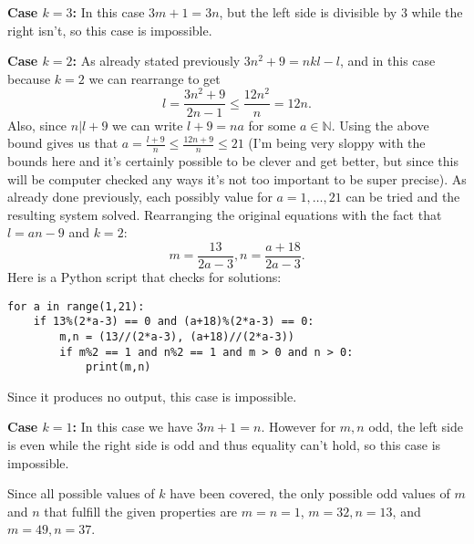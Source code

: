 \documentclass[letterpaper, reqno,11pt]{article}
\begin{document}
\medskip

{\noindent\bf Case $k=3$:} In this case $3m+1=3n$, but the left side is divisible by $3$ while the right isn't, so this case is impossible.

\medskip

{\noindent\bf Case $k=2$:} As already stated previously $3n^2+9=nkl-l$, and in this case because $k=2$ we can rearrange to get
\[
l=\frac{3n^2+9}{2n-1}\leq \frac{12n^2}{n}=12n
.\]
Also, since $n|l+9$ we can write $l+9=na$ for some $a\in \mathbb{N}$. Using the above bound gives us that $a=\frac{l+9}{n}\leq \frac{12n+9}{n}\leq 21$ (I'm being very sloppy with the bounds here and it's certainly possible to be clever and get better, but since this will be computer checked any ways it's not too important to be super precise). As already done previously, each possibly value for $a=1,\ldots,21$ can be tried and the resulting system solved. Rearranging the original equations with the fact that $l=an-9$ and $k=2$:
\[
m=\frac{13}{2a-3},n=\frac{a+18}{2a-3}
.\]
Here is a Python script that checks for solutions:
\begin{lstlisting}
for a in range(1,21):
    if 13%(2*a-3) == 0 and (a+18)%(2*a-3) == 0:
        m,n = (13//(2*a-3), (a+18)//(2*a-3))
        if m%2 == 1 and n%2 == 1 and m > 0 and n > 0:
            print(m,n)
\end{lstlisting}
Since it produces no output, this case is impossible.

\medskip

{\noindent\bf Case $k=1$:} In this case we have $3m+1=n$. However for $m,n$ odd, the left side is even while the right side is odd and thus equality can't hold, so this case is impossible.

\medskip

Since all possible values of $k$ have been covered, the only possible odd values of $m$ and $n$ that fulfill the given properties are $m=n=1$, $m=32,n=13$, and $m=49,n=37$.
\end{document}
